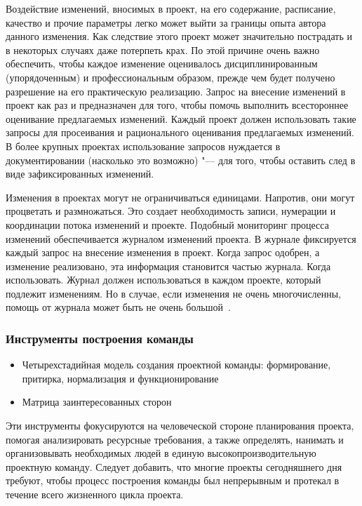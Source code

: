 \documentclass{../industrial-development}
\begin{document}
Воздействие изменений, вносимых в проект, на его содержание, расписание, качество и прочие параметры легко может выйти за границы опыта автора данного изменения. Как следствие этого проект может значительно пострадать и в некоторых случаях даже потерпеть крах. По этой причине очень важно обеспечить, чтобы каждое изменение оценивалось дисциплинированным (упорядоченным) и профессиональным образом, прежде чем будет получено разрешение на его практическую реализацию. Запрос на внесение изменений в проект как раз и предназначен для того, чтобы помочь выполнить всестороннее
оценивание предлагаемых изменений. Каждый проект должен использовать такие запросы для просеивания и рационального оценивания предлагаемых изменений. В более крупных проектах использование запросов нуждается в документировании (насколько это возможно) "--- для того, чтобы оставить след в виде зафиксированных изменений.

Изменения в проектах могут не ограничиваться единицами. Напротив, они могут процветать и размножаться. Это создает необходимость записи, нумерации и координации потока изменений и проекте. Подобный мониторинг процесса изменений обеспечивается журналом изменений проекта. В журнале фиксируется каждый запрос на внесение изменения в проект. Когда запрос одобрен, а изменение реализовано, эта информация становится частью журнала. Когда использовать. Журнал должен использоваться в каждом проекте, который подлежит изменениям. Но в случае, если изменения не очень многочисленны, помощь от журнала может быть не очень большой~\cite[с.~453--478]{Miloshevich}.

\begin{frame} \frametitle{Инструменты построения команды}
  \begin{itemize}
     \item Четырехстадийная модель создания проектной команды: формирование, притирка, нормализация и функционирование
     \item Матрица заинтересованных сторон
   \end{itemize}
\end{frame}

\lecturenotes

Эти инструменты фокусируются на человеческой стороне планирования проекта, помогая анализировать ресурсные требования, а также определять, нанимать и организовывать необходимых людей в единую высокопроизводительную проектную команду. Следует добавить, что многие проекты сегодняшнего дня требуют, чтобы процесс построения команды был непрерывным и протекал в течение всего жизненного цикла проекта.
\end{document}
